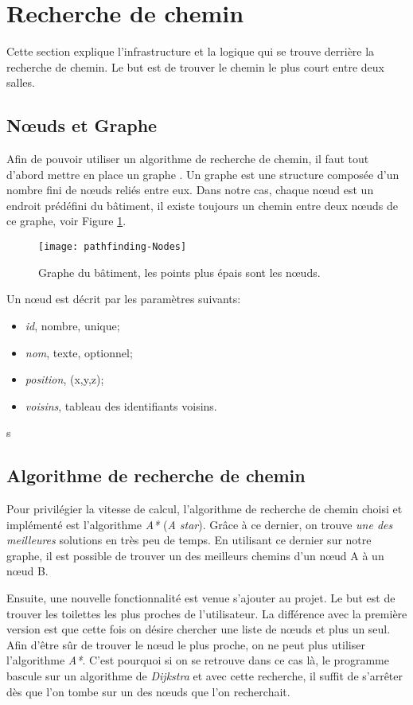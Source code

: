\section{Recherche de chemin}
Cette section explique l'infrastructure et la logique qui se trouve derrière la recherche de chemin. Le but est de trouver le chemin le plus court entre deux salles.

\subsection{Nœuds et Graphe}
Afin de pouvoir utiliser un algorithme de recherche de chemin, il faut tout d'abord mettre en place un graphe \cite{wiki-graph}. Un graphe est une structure composée d'un nombre fini de nœuds reliés entre eux. Dans notre cas, chaque nœud est un endroit prédéfini du bâtiment, il existe toujours un chemin entre deux nœuds de ce graphe, voir Figure \ref{fig:pathfinding-nodes}.

\begin{figure}
	\centering
	\texttt{[image: pathfinding-Nodes]}
	\caption{Graphe du bâtiment, les points plus épais sont les nœuds.}
	\label{fig:pathfinding-nodes}
\end{figure}

Un nœud est décrit par les paramètres suivants:
\begin{itemize}[noitemsep]
	\item \emph{id}, nombre, unique;
	\item \emph{nom}, texte, optionnel;
	\item \emph{position}, (x,y,z);
	\item \emph{voisins}, tableau des identifiants voisins.
\end{itemize}s

\subsection{Algorithme de recherche de chemin}
Pour privilégier la vitesse de calcul, l'algorithme de recherche de chemin choisi et implémenté est l'algorithme \emph{A*} \cite{wiki-astar} (\textit{A star}). Grâce à ce dernier, on trouve \textit{une des meilleures} solutions en très peu de temps. En utilisant ce dernier sur notre graphe, il est possible de trouver un des meilleurs chemins d'un nœud A à un nœud B.

Ensuite, une nouvelle fonctionnalité est venue s'ajouter au projet. Le but est de trouver les toilettes les plus proches de l'utilisateur. La différence avec la première version est que cette fois on désire chercher une liste de nœuds et plus un seul. Afin d'être sûr de trouver le nœud le plus proche, on ne peut plus utiliser l'algorithme \textit{A*}. C'est pourquoi si on se retrouve dans ce cas là, le programme bascule sur un algorithme de \emph{Dijkstra} \cite{wiki-dijkstra} et avec cette recherche, il suffit de s'arrêter dès que l'on tombe sur un des nœuds que l'on recherchait.